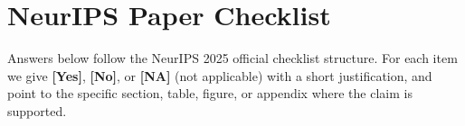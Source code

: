 
\section*{NeurIPS Paper Checklist}
\label{sec:neurips-checklist}

Answers below follow the NeurIPS 2025 official checklist structure.
For each item we give \textbf{[Yes]}, \textbf{[No]}, or \textbf{[NA]}
(not applicable) with a short justification, and point to the
specific section, table, figure, or appendix where the claim is
supported.

